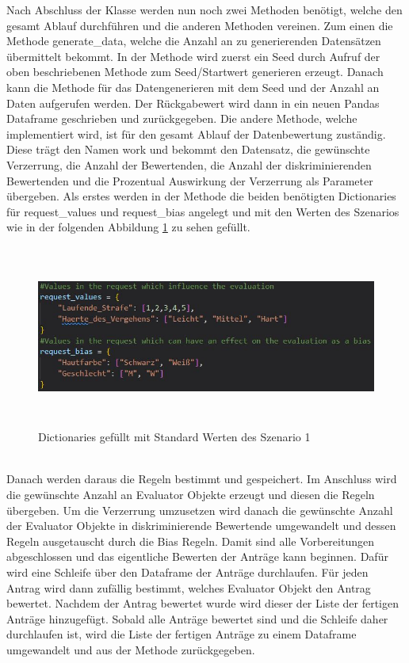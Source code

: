 \begin{onehalfspace}
Nach Abschluss der Klasse werden nun noch zwei Methoden benötigt, welche den gesamt Ablauf durchführen und die anderen Methoden vereinen. Zum einen die Methode \glqq{}generate\_data\grqq{}, welche die Anzahl an zu generierenden Datensätzen übermittelt bekommt. In der Methode wird zuerst ein Seed durch Aufruf der oben beschriebenen Methode zum Seed/Startwert generieren erzeugt. Danach kann die Methode für das Datengenerieren mit dem Seed und der Anzahl an Daten aufgerufen werden. Der Rückgabewert wird dann in ein neuen Pandas Dataframe geschrieben und zurückgegeben. Die andere Methode, welche implementiert wird, ist für den gesamt Ablauf der Datenbewertung zuständig. Diese trägt den Namen \glqq{}work\grqq{} und bekommt den Datensatz, die gewünschte Verzerrung, die Anzahl der Bewertenden, die Anzahl der diskriminierenden Bewertenden und die Prozentual Auswirkung der Verzerrung als Parameter übergeben. Als erstes werden in der Methode die beiden benötigten Dictionaries für \glqq{}request\_values und request\_bias\grqq{} angelegt und mit den Werten des Szenarios wie in der folgenden Abbildung \ref{fig:standardValues} zu sehen gefüllt.\\
\begin{figure}[h]
    \centering
    \includegraphics[width=16cm,height=6cm]{Diagramme/Sz1_standardValues.JPG}
    \caption{Dictionaries gefüllt mit Standard Werten des Szenario 1}
    \label{fig:standardValues}
\end{figure}\\
Danach werden daraus die Regeln bestimmt und gespeichert. Im Anschluss wird die gewünschte Anzahl an \glqq{}Evaluator\grqq{} Objekte erzeugt und diesen die Regeln übergeben. Um die Verzerrung umzusetzen wird danach die gewünschte Anzahl der \glqq{}Evaluator\grqq{} Objekte in diskriminierende Bewertende umgewandelt und dessen Regeln ausgetauscht durch die Bias Regeln. Damit sind alle Vorbereitungen abgeschlossen und das eigentliche Bewerten der Anträge kann beginnen. Dafür wird eine Schleife über den Dataframe der Anträge durchlaufen. Für jeden Antrag wird dann zufällig bestimmt, welches \glqq{}Evaluator\grqq{} Objekt den Antrag bewertet. Nachdem der Antrag bewertet wurde wird dieser der Liste der fertigen Anträge hinzugefügt. Sobald alle Anträge bewertet sind und die Schleife daher durchlaufen ist, wird die Liste der fertigen Anträge zu einem Dataframe umgewandelt und aus der Methode zurückgegeben. 

\end{onehalfspace}
